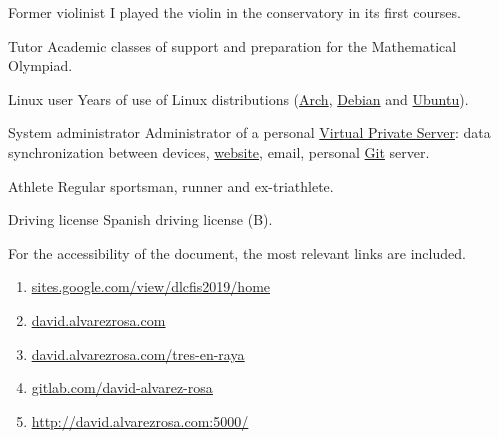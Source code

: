 

\cvachievement{\faMusic}
{Former violinist \smallskip}
{\small {}%
  \small{}}
I played the violin in the conservatory in its first courses.

\divider

\cvachievement{\faGroup}
{Tutor \smallskip}
{Academic classes of support and preparation for the Mathematical Olympiad.}

\divider

\cvachievement{\faLinux}
{Linux user \smallskip}
{Years of use of Linux distributions (\href{https://www.archlinux.org/}{Arch},
\href{https://www.debian.org/}{Debian} and \href{https://ubuntu.com/}{Ubuntu}).}

\divider

\cvachievement{\faServer}
{System administrator}
{Administrator of a personal
\href{https://en.wikipedia.org/wiki/Virtual_private_server}{Virtual Private
Server}: data synchronization between devices,
\href{https://david.alvarezrosa.com}{website\footnotemark}, email, personal
\href{https://en.wikipedia.org/wiki/Git}{Git} server.}

\divider

\cvachievement{\faHeartbeat}
{Athlete \smallskip}
{Regular sportsman, runner and ex-triathlete.}

\divider

\cvachievement{\faCar}
{Driving license \smallskip}
{\small {}%
  \small{}}
Spanish driving license (B).


\medskip

For the accessibility of the document, the most relevant links are included. \\[1.25ex]
\begin{enumerate}
  \item \href{https://sites.google.com/view/dlcfis2019/home}
  {\underline{sites.google.com/view/dlcfis2019/home}}
  \item \href{https://david.alvarezrosa.com}{\underline{david.alvarezrosa.com}}
  \item \href{https://david.alvarezrosa.com/tres-en-raya}
  {\underline{david.alvarezrosa.com/tres-en-raya}}
  \item \href{https://gitlab.com/david-alvarez-rosa}
  {\underline{gitlab.com/david-alvarez-rosa}}
  \item \href{http://david.alvarezrosa.com:5000/}
  {\underline{http://david.alvarezrosa.com:5000/}}
\end{enumerate}

